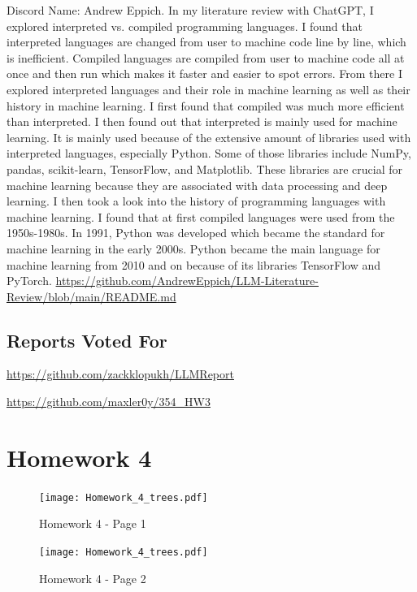 \documentclass{article}
\theoremstyle{plain}
\theoremstyle{definition}
\theoremstyle{remark}
\begin{document}
Discord Name: Andrew Eppich.   
In my literature review with ChatGPT, I explored interpreted vs. compiled programming languages. I found that interpreted languages are changed from user to machine code line by line, which is inefficient. Compiled languages are compiled from user to machine code all at once and then run which makes it faster and easier to spot errors. From there I explored interpreted languages and their role in machine learning as well as their history in machine learning. I first found that compiled was much more efficient than interpreted. I then found out that interpreted is mainly used for machine learning. It is mainly used because of the extensive amount of libraries used with interpreted languages, especially Python. Some of those libraries include NumPy, pandas, scikit-learn, TensorFlow, and Matplotlib. These libraries are crucial for machine learning because they are associated with data processing and deep learning. I then took a look into the history of programming languages with machine learning. I found that at first compiled languages were used from the 1950s-1980s. In 1991, Python was developed which became the standard for machine learning in the early 2000s. Python became the main language for machine learning from 2010 and on because of its libraries TensorFlow and PyTorch. 
\url{https://github.com/AndrewEppich/LLM-Literature-Review/blob/main/README.md}

\subsection{Reports Voted For}

\url{https://github.com/zackklopukh/LLMReport}

\url{https://github.com/maxler0y/354_HW3}

\section{Homework 4}\label{homework4}

\begin{figure}[H]
  \centering
  \texttt{[image: Homework\_4\_trees.pdf]}
  \caption{Homework 4 - Page 1}
  \label{fig:homework4_page1}
\end{figure}

\begin{figure}[H]
  \centering
  \texttt{[image: Homework\_4\_trees.pdf]}
  \caption{Homework 4 - Page 2}
  \label{fig:homework4_page2}
\end{figure}
\end{document}
